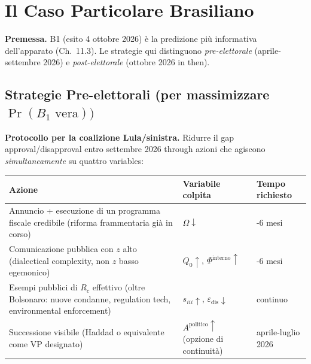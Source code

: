 \section{Il Caso Particolare
Brasiliano}\label{il-caso-particolare-Brazilian}

\Hypoth{} \textbf{Premessa.} B1 (esito 4 ottobre 2026) è la predizione
più informativa dell'apparato (Ch.~11.3). Le strategie qui distinguono
\emph{pre-elettorale} (aprile-settembre 2026) e \emph{post-elettorale}
(ottobre 2026 in then).

\subsection{\texorpdfstring{Strategie Pre-elettorali (per massimizzare
\(\Pr(B_1 \text{ vera}))\)}{Strategie Pre-elettorali (per massimizzare \textbackslash Pr(B\_1 \textbackslash text\{ vera\}))}}\label{strategie-pre-elettorali-per-massimizzare-prb_1-text-vera}

\Hypoth{} \textbf{Protocollo per la coalizione Lula/sinistra.} Ridurre
il gap approval/disapproval entro settembre 2026 through azioni che
agiscono \emph{simultaneamente} su quattro variables:

{\def\LTcaptype{none} %
{\small\begin{longtable}[]{@{}
  >{\raggedright\arraybackslash}p{}
  >{\raggedright\arraybackslash}p{}
  >{\raggedright\arraybackslash}p{}@{}}
\toprule\noalign{}
\begin{minipage}[b]{\linewidth}\raggedright
Azione
\end{minipage} & \begin{minipage}[b]{\linewidth}\raggedright
Variabile colpita
\end{minipage} & \begin{minipage}[b]{\linewidth}\raggedright
Tempo richiesto
\end{minipage} \\
\midrule\noalign{}
\endhead
\bottomrule\noalign{}
\endlastfoot
Annuncio + esecuzione di un programma fiscale credibile (riforma
frammentaria già in corso) & \(\Omega \downarrow\) & 4-6 mesi \\
Comunicazione pubblica con \(z\) alto (dialectical complexity, non \(z\)
basso egemonico) & \(Q_0 \uparrow\), \(\Phi^{\text{interno}} \uparrow\)
& 3-6 mesi \\
Esempi pubblici di \(R_c\) effettivo (oltre Bolsonaro: nuove condanne,
regulation tech, environmental enforcement) & \(s_{iii} \uparrow\),
\(\varepsilon_{\text{dis}} \downarrow\) & continuo \\
Successione visibile (Haddad o equivalente come VP designato) &
\(A^{\text{politico}} \uparrow\) (opzione di continuità) & aprile-luglio
2026 \\
\end{longtable}}
}

